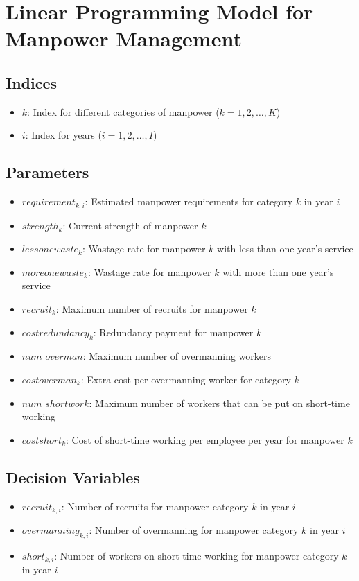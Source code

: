 \documentclass{article}
\begin{document}
\section*{Linear Programming Model for Manpower Management}

\subsection*{Indices}
\begin{itemize}
    \item $k$: Index for different categories of manpower ($k = 1, 2, \ldots, K$)
    \item $i$: Index for years ($i = 1, 2, \ldots, I$)
\end{itemize}

\subsection*{Parameters}
\begin{itemize}
    \item $requirement_{k, i}$: Estimated manpower requirements for category $k$ in year $i$
    \item $strength_{k}$: Current strength of manpower $k$
    \item $lessonewaste_{k}$: Wastage rate for manpower $k$ with less than one year’s service
    \item $moreonewaste_{k}$: Wastage rate for manpower $k$ with more than one year’s service
    \item $recruit_{k}$: Maximum number of recruits for manpower $k$
    \item $costredundancy_{k}$: Redundancy payment for manpower $k$
    \item $num\_overman$: Maximum number of overmanning workers
    \item $costoverman_{k}$: Extra cost per overmanning worker for category $k$
    \item $num\_shortwork$: Maximum number of workers that can be put on short-time working
    \item $costshort_{k}$: Cost of short-time working per employee per year for manpower $k$
\end{itemize}

\subsection*{Decision Variables}
\begin{itemize}
    \item $recruit_{k, i}$: Number of recruits for manpower category $k$ in year $i$
    \item $overmanning_{k, i}$: Number of overmanning for manpower category $k$ in year $i$
    \item $short_{k, i}$: Number of workers on short-time working for manpower category $k$ in year $i$
\end{itemize}
\end{document}
